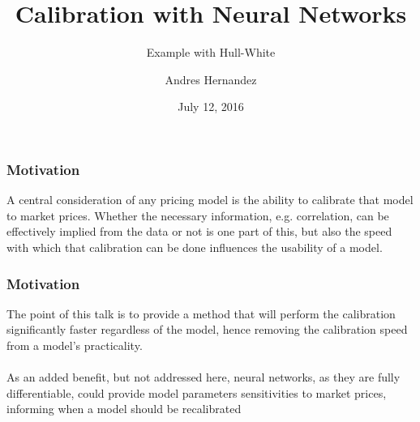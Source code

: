 \documentclass[bigger]{beamer}
\begin{document}
\lstset{escapechar=@,style=customc}
\title{Calibration with Neural Networks}
\subtitle{Example with Hull-White}
\author{Andres Hernandez}
\date{July 12, 2016} 

{
\begin{frame}
\titlepage
\end{frame} 
}

\begin{frame}
\frametitle{Motivation}
  \justifying

A central consideration of any pricing model is the ability to calibrate that model to market prices. Whether the necessary information, e.g. correlation, can be effectively implied from the data or not is one part of this, but also the speed with which that calibration can be done influences the usability of a model. 

\end{frame}

\begin{frame}
\frametitle{Motivation} 
  \justifying
The point of this talk is to provide a method that will perform the calibration significantly faster regardless of the model, hence removing the calibration speed from a model's practicality.
\\~\\
As an added benefit, but not addressed here, neural networks, as they are fully differentiable, could provide model parameters sensitivities to market prices, informing when a model should be recalibrated
\end{frame}
\end{document}
